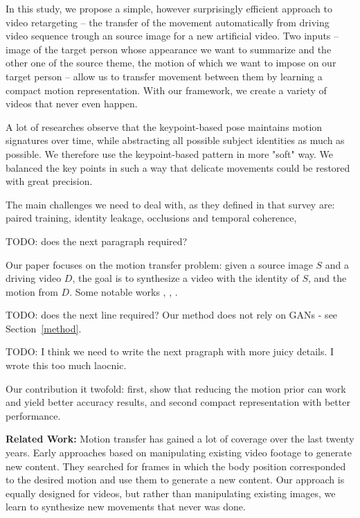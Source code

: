 \documentclass{article}
\begin{document}
In this study, we propose a simple, however surprisingly efficient approach to video retargeting – the transfer of the movement automatically from driving video sequence trough an source image for a new artificial video. Two inputs – image of the target person whose appearance we want to summarize and the other one of the source theme, the motion of which we want to impose on our target person – allow us to transfer movement between them by learning a compact motion representation.
With our framework, we create a variety of videos that never even happen.

A lot of researches observe that the keypoint-based pose maintains motion
signatures over time, while abstracting all possible subject identities as
much as possible. We therefore use the keypoint-based pattern in more "soft" way. We balanced the key points in such a way that delicate movements could be restored with great precision.

The main challenges we need to deal with, as they defined in that survey are: paired training, identity leakage, occlusions and temporal coherence,

TODO: does the next paragraph required?

Our paper focuses on the motion transfer problem: given a source image $S$
and a driving video $D$, the goal is to synthesize a video with the identity
of $S$, and the motion from $D$.
Some notable works \cite{siarohin2020order}, \cite{wiles2018x2face},
\cite{siarohin2019animating}.

TODO: does the next line required?
Our method does not rely on GANs - see Section~\ref{method}.

TODO: I think we need to write the next pragraph with more juicy details. I wrote this too much laocnic.

Our contribution it twofold: first, show that reducing the motion prior can
work and yield better accuracy results, and second compact representation with better performance.

\medskip

\textbf{Related Work:}
Motion transfer has gained a lot of coverage over the last twenty years. Early approaches based on manipulating existing video footage to generate new content. They searched for frames in which the body position corresponded to the desired motion and use them to generate a new content\cite{bregler1997video}. Our approach is equally designed for videos, but rather than manipulating existing images, we learn to synthesize new movements that never was done.
\end{document}
